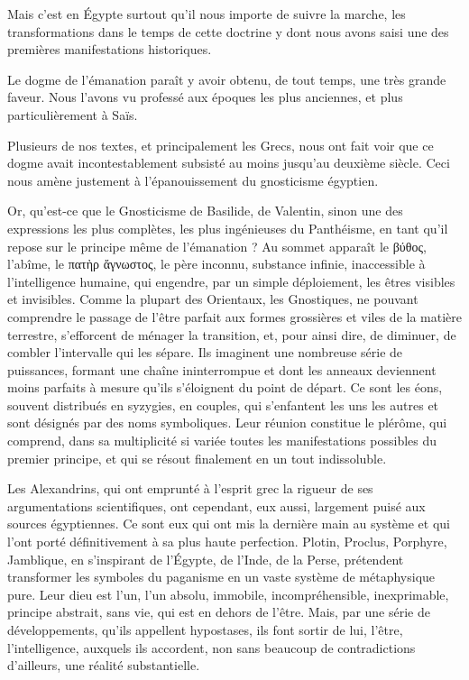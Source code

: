 \documentclass[letterpaper,twocolumn,openany,nodeprecatedcode]{dndbook}
\begin{document}
Mais c'est en Égypte surtout qu'il nous importe de suivre la marche, les transformations dans le temps de cette doctrine y dont nous avons saisi une des premières manifestations historiques.

Le dogme de l'émanation paraît y avoir obtenu, de tout temps, une très grande faveur. Nous l'avons vu professé aux époques les plus anciennes, et plus particulièrement à Saïs.

Plusieurs de nos textes, et principalement les Grecs, nous ont fait voir que ce dogme avait incontestablement subsisté au moins jusqu'au deuxième siècle. Ceci nous amène justement à l'épanouissement du gnosticisme égyptien.

Or, qu'est-ce que le Gnosticisme de Basilide, de Valentin, sinon une des expressions les plus complètes, les plus ingénieuses du Panthéisme, en tant qu'il repose sur le principe même de l'émanation ? Au sommet apparaît le βύθος, l'abîme, le πατὴρ ἄγνωστος, le père inconnu, substance infinie, inaccessible à l'intelligence humaine, qui engendre, par un simple déploiement, les êtres visibles et invisibles. Comme la plupart des Orientaux, les Gnostiques, ne pouvant comprendre le passage de l'être parfait aux formes grossières et viles de la matière terrestre, s'efforcent de ménager la transition, et, pour ainsi dire, de diminuer, de combler l'intervalle qui les sépare. Ils imaginent une nombreuse série de puissances, formant une chaîne ininterrompue et dont les anneaux deviennent moins parfaits à mesure qu'ils s'éloignent du point de départ. Ce sont les éons, souvent distribués en syzygies, en couples, qui s'enfantent les uns les autres et sont désignés par des noms symboliques. Leur réunion constitue le plérôme, qui comprend, dans sa multiplicité si variée toutes les manifestations possibles du premier principe, et qui se résout finalement en un tout indissoluble.

Les Alexandrins, qui ont emprunté à l'esprit grec la rigueur de ses argumentations scientifiques, ont cependant, eux aussi, largement puisé aux sources égyptiennes. Ce sont eux qui ont mis la dernière main au système et qui l'ont porté définitivement à sa plus haute perfection. Plotin, Proclus, Porphyre, Jamblique, en s'inspirant de l'Égypte, de l'Inde, de la Perse, prétendent transformer les symboles du paganisme en un vaste système de métaphysique pure. Leur dieu est l'un, l'un absolu, immobile, incompréhensible, inexprimable, principe abstrait, sans vie, qui est en dehors de l'être. Mais, par une série de développements, qu'ils appellent hypostases, ils font sortir de lui, l'être, l'intelligence, auxquels ils accordent, non sans beaucoup de contradictions d'ailleurs, une réalité substantielle.
\end{document}
